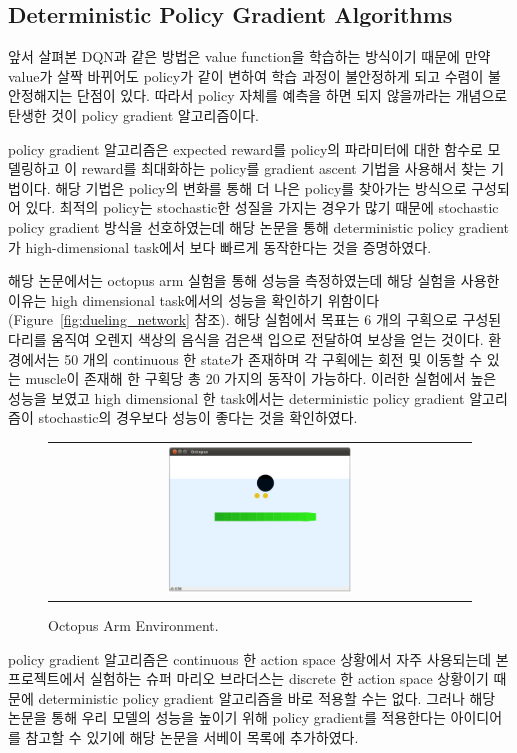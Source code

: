 \subsection{Deterministic Policy Gradient Algorithms}
\label{sec:survey:DPG}
앞서 살펴본 DQN과 같은 방법은 value function을 학습하는 방식이기 때문에 만약 value가 살짝 바뀌어도 policy가 같이 변하여 학습 과정이 불안정하게 되고 수렴이 불안정해지는 단점이 있다. 
따라서 policy 자체를 예측을 하면 되지 않을까라는 개념으로 탄생한 것이 policy gradient 알고리즘이다. 

policy gradient 알고리즘은 expected reward를 policy의 파라미터에 대한 함수로 모델링하고 이 reward를 최대화하는 policy를 gradient ascent 기법을 사용해서 찾는 기법이다.
해당 기법은 policy의 변화를 통해 더 나은 policy를 찾아가는 방식으로 구성되어 있다. 
최적의 policy는 stochastic한 성질을 가지는 경우가 많기 때문에 stochastic policy gradient 방식을 선호하였는데 해당 논문을 통해 deterministic policy gradient가 high-dimensional task에서 보다 빠르게 동작한다는 것을 증명하였다. 

해당 논문에서는 octopus arm 실험을 통해 성능을 측정하였는데 해당 실험을 사용한 이유는 high dimensional task에서의 성능을 확인하기 위함이다 (Figure~\ref{fig:dueling_network} 참조).
해당 실험에서 목표는 6 개의 구획으로 구성된 다리를 움직여 오렌지 색상의 음식을 검은색 입으로 전달하여 보상을 얻는 것이다.
환경에서는 50 개의 continuous 한 state가 존재하며 각 구획에는 회전 및 이동할 수 있는 muscle이 존재해 한 구획당 총 20 가지의 동작이 가능하다. 
이러한 실험에서 높은 성능을 보였고 high dimensional 한 task에서는 deterministic policy gradient 알고리즘이 stochastic의 경우보다 성능이 좋다는 것을 확인하였다.

\begin{figure}[h]
\begin{center}
\begin{tabular}{c}
     \includegraphics[width=0.45\textwidth]{FIG/OctopusArm.png} \\
\end{tabular}
\caption{
	Octopus Arm Environment.
}
\label{fig:octopus_arm}
\end{center}
\end{figure}

policy gradient 알고리즘은 continuous 한 action space 상황에서 자주 사용되는데 본 프로젝트에서 실험하는 슈퍼 마리오 브라더스는 discrete 한 action space 상황이기 때문에 deterministic policy gradient 알고리즘을 바로 적용할 수는 없다. 
그러나 해당 논문을 통해 우리 모델의 성능을 높이기 위해 policy gradient를 적용한다는 아이디어를 참고할 수 있기에 해당 논문을 서베이 목록에 추가하였다.
